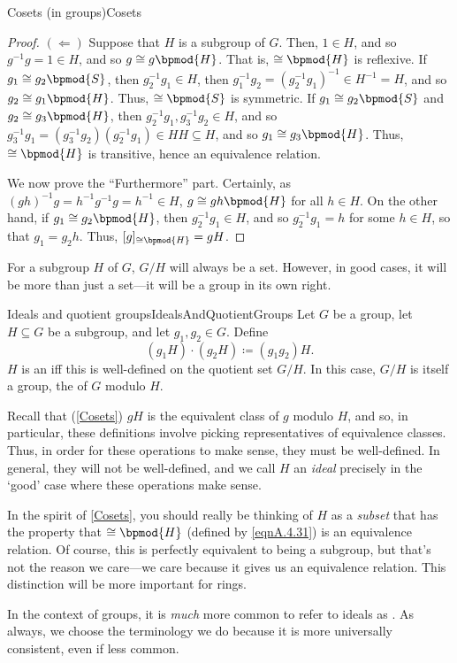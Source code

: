 \begin{prp}{Cosets (in groups)}{Cosets}
\begin{proof}
\blankline
\noindent
$(\Leftarrow )$ Suppose that $H$ is a subgroup of $G$.  Then, $1\in H$, and so $g^{-1}g=1\in H$, and so $g\cong g\bpmod{H}$.  That is, $\cong \bpmod{H}$ is reflexive.  If $g_1\cong g_2\bpmod{S}$, then $g_2^{-1}g_1\in H$, then $g_1^{-1}g_2=(g_2^{-1}g_1)^{-1}\in H^{-1}=H$, and so $g_2\cong g_1\bpmod{H}$.  Thus, $\cong \bpmod{S}$ is symmetric.  If $g_1\cong g_2\bpmod{S}$ and $g_2\cong g_3\bpmod{H}$, then $g_2^{-1}g_1,g_3^{-1}g_2\in H$, and so $g_3^{-1}g_1=(g_3^{-1}g_2)(g_2^{-1}g_1)\in HH\subseteq H$, and so $g_1\cong g_3\bpmod{H}$.  Thus, $\cong \bpmod{H}$ is transitive, hence an equivalence relation.

\blankline
\noindent
We now prove the ``Furthermore\textellipsis '' part.  Certainly, as $(gh)^{-1}g=h^{-1}g^{-1}g=h^{-1}\in H$, $g\cong gh\bpmod{H}$ for all $h\in H$.  On the other hand, if $g_1\cong g_2\bpmod{H}$, then $g_2^{-1}g_1\in H$, and so $g_2^{-1}g_1=h$ for some $h\in H$, so that $g_1=g_2h$.  Thus, $[g]_{\cong \bpmod{H}}=gH$.
\end{proof}
\end{prp}
For a subgroup $H$ of $G$, $G/H$ will always be a set.  However, in good cases, it will be more than just a set---it will be a group in its own right.
\begin{dfn}{Ideals and quotient groups}{IdealsAndQuotientGroups}
Let $G$ be a group, let $H\subseteq G$ be a subgroup, and let $g_1,g_2\in G$.  Define
\begin{equation}
(g_1H)\cdot (g_2H)\coloneqq (g_1g_2)H.
\end{equation}
$H$ is an  iff this is well-defined on the quotient set $G/H$.  In this case, $G/H$ is itself a group, the  of $G$ modulo $H$.
\begin{rmk}
Recall that (\cref{Cosets}) $gH$ is the equivalent class of $g$ modulo $H$, and so, in particular, these definitions involve picking representatives of equivalence classes.  Thus, in order for these operations to make sense, they must be well-defined.  In general, they will not be well-defined, and we call $H$ an \emph{ideal} precisely in the `good' case where these operations make sense.
\end{rmk}
\begin{rmk}
In the spirit of \cref{Cosets}, you should really be thinking of $H$ as a \emph{subset} that has the property that $\cong \bpmod{H}$ (defined by \eqref{eqnA.4.31}) is an equivalence relation.  Of course, this is perfectly equivalent to being a subgroup, but that's not the reason we care---we care because it gives us an equivalence relation.  This distinction will be more important for rings.
\end{rmk}
\begin{rmk}
In the context of groups, it is \emph{much} more common to refer to ideals as .  As always, we choose the terminology we do because it is more universally consistent, even if less common.
\end{rmk}
\end{dfn}
